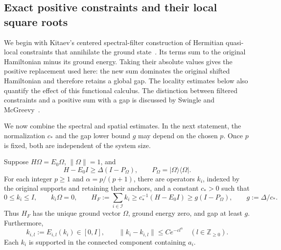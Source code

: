 \subsection{Exact positive constraints and their local square roots}

We begin with Kitaev's centered spectral-filter construction of Hermitian
quasi-local constraints that annihilate the ground
state~\cite[Appendix~D.1.2, Proposition~D.1]{Kitaev2006Anyons}.
Its terms sum to the original Hamiltonian minus its ground energy.
Taking their absolute values gives the positive replacement used here:
the new sum dominates the original shifted Hamiltonian and therefore
retains a global gap.  The locality estimates below also quantify the
effect of this functional calculus.  The distinction between filtered
constraints and a positive sum with a gap is discussed by Swingle and
McGreevy~\cite[Section~8.4]{SwingleMcGreevy2016}.

We now combine the spectral and spatial estimates.  In the next statement,
the normalization $c_*$ and the gap lower bound $g$ may depend on the chosen
$p$.  Once $p$ is fixed, both are independent of the system size.

\begin{proposition}
\label{prop:positive}
Suppose $H\Omega=E_0\Omega$, $\|\Omega\|=1$, and
\[
 H-E_0I\ge\Delta(I-P_\Omega),\qquad
 P_\Omega=|\Omega\rangle\langle\Omega|.
\]
For each integer $p\ge1$ and $\alpha=p/(p+1)$, there are operators
$k_i$, indexed by the original supports and retaining their anchors, and a
constant $c_*>0$ such that
\begin{equation}
 0\le k_i\le I,\qquad k_i\Omega=0,\qquad
 H_F:=\sum_{i\in\mathcal I}k_i
       \ge c_*^{-1}(H-E_0I)\ge g(I-P_\Omega),
 \qquad g:=\Delta/c_*.
 \label{eq:quasilocal-positive}
\end{equation}
Thus $H_F$ has the unique ground vector $\Omega$, ground energy zero, and
gap at least $g$.  Furthermore,
\begin{equation}
 k_{i,l}:=E_{i,l}(k_i)\in[0,I],\qquad
 \|k_i-k_{i,l}\|\le Ce^{-cl^\alpha}
 \quad(l\in\mathbb Z_{\ge0}).
 \label{eq:quasilocal-positive-tail}
\end{equation}
Each $k_i$ is supported in the connected component containing $a_i$.
\end{proposition}

